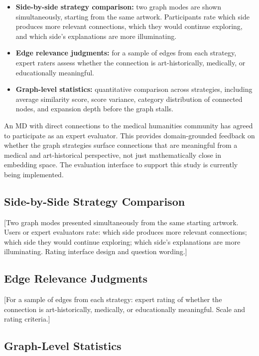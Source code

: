 \documentclass[12pt, a4paper]{article}
\begin{document}
\begin{itemize}
    \item \textbf{Side-by-side strategy comparison:} two graph modes are shown simultaneously,
    starting from the same artwork. Participants rate which side produces more relevant
    connections, which they would continue exploring, and which side's explanations are more
    illuminating.
    \item \textbf{Edge relevance judgments:} for a sample of edges from each strategy, expert
    raters assess whether the connection is art-historically, medically, or educationally
    meaningful.
    \item \textbf{Graph-level statistics:} quantitative comparison across strategies, including
    average similarity score, score variance, category distribution of connected nodes, and
    expansion depth before the graph stalls.
\end{itemize}

An MD with direct connections to the medical humanities community has agreed to participate as
an expert evaluator. This provides domain-grounded feedback on whether the graph strategies
surface connections that are meaningful from a medical and art-historical perspective, not just
mathematically close in embedding space. The evaluation interface to support this study is
currently being implemented.

\subsection{Side-by-Side Strategy Comparison}

[Two graph modes presented simultaneously from the same starting artwork. Users or expert
evaluators rate: which side produces more relevant connections; which side they would continue
exploring; which side's explanations are more illuminating. Rating interface design and question
wording.]

\subsection{Edge Relevance Judgments}

[For a sample of edges from each strategy: expert rating of whether the connection is
art-historically, medically, or educationally meaningful. Scale and rating criteria.]

\subsection{Graph-Level Statistics}
\end{document}
